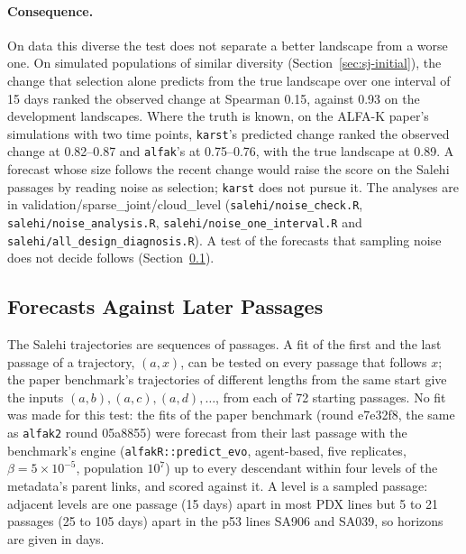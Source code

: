 \documentclass[11pt]{article}
\begin{document}
\paragraph{Consequence.} On data this diverse the test does not separate a
better landscape from a worse one. On simulated populations of similar
diversity (Section~\ref{sec:sj-initial}), the change that selection alone
predicts from the true landscape over one interval of 15 days ranked the
observed change at Spearman 0.15, against 0.93 on the development landscapes.
Where the truth is known, on the ALFA-K paper's simulations with two time
points, \texttt{karst}'s predicted change ranked the observed change at
0.82--0.87 and \texttt{alfak}'s at 0.75--0.76, with the true landscape at
0.89. A forecast whose size follows the recent change would raise the score on
the Salehi passages by reading noise as selection; \texttt{karst} does not
pursue it. The analyses are in validation/sparse\_joint/cloud\_level
(\texttt{salehi/noise\_check.R}, \texttt{salehi/noise\_analysis.R},
\texttt{salehi/noise\_one\_interval.R} and
\texttt{salehi/all\_design\_diagnosis.R}). A test of the forecasts that
sampling noise does not decide follows (Section~\ref{sec:salehi-horizon}).

\subsection{Forecasts Against Later Passages}
\label{sec:salehi-horizon}

The Salehi trajectories are sequences of passages. A fit of the first and the
last passage of a trajectory, $(a,x)$, can be tested on every passage that
follows $x$; the paper benchmark's trajectories of different lengths from the
same start give the inputs $(a,b), (a,c), (a,d), \dots$, from each of 72
starting passages. No fit was made for this test: the fits of the paper
benchmark (round e7e32f8, the same as \texttt{alfak2} round 05a8855) were
forecast from their last passage with the benchmark's engine
(\texttt{alfakR::predict\_evo}, agent-based, five replicates, $\beta=5\times
10^{-5}$, population $10^7$) up to every descendant within four levels of the
metadata's parent links, and scored against it. A level is a sampled passage:
adjacent levels are one passage (15 days) apart in most PDX lines but 5 to 21
passages (25 to 105 days) apart in the p53 lines SA906 and SA039, so horizons
are given in days.
\end{document}
